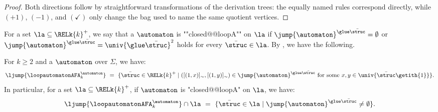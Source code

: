 \documentclass[10pt,a4paper]{article}
\theoremstyle{definition}
\theoremstyle{remark}
\DeclarePairedDelimiter\set{\{}{\}}
\DeclarePairedDelimiter\tuple{(}{)}
\newcommand{\mul}[1]{\bar{#1}}
\newcommand{\vsig}{\Sigma}
\begin{document}
\begin{proof}
Both directions follow by straightforward transformations of the derivation trees:
the equally named rules correspond directly, while $(+1)$, $(-1)$, and $(\checkmark)$
only change the bag used to name the same quotient vertices.
\end{proof}
For a set $\la \subseteq \RELk{k}^{+}$,
we say that a  $\automaton$ is ""closed@@loopA"" on $\la$ if $\jump{\automaton}^{\glue \mul{\struc}} = \emptyset$ or $\jump{\automaton}^{\glue \mul{\struc}} = \univ{\glue \mul{\struc}}^2$ holds for every $\mul{\struc} \in \la$.
By , we have the following.
\begin{lem}\label{lemma: to 2AFA}
    For $k \ge 2$ and a  $\automaton$ over $\vsig$,
    we have:
    \[\ljump{\loopautomatonAFA_{k}^{\automaton}} ~=~ \set{\mul{\struc} \in \RELk{k}^{+} \mid \tuple{[\tuple{1,x}]_{\sim}, [\tuple{1,y}]_{\sim}} \in \jump{\automaton}^{\glue \mul{\struc}} \mbox{ for some $x, y \in \univ{\mul{\struc}\getith{1}}$}}.\]
    In particular, for a set $\la \subseteq \RELk{k}^{+}$, if $\automaton$ is "closed@@loopA" on $\la$,
    we have:
    \[\ljump{\loopautomatonAFA_{k}^{\automaton}} \cap \la ~=~ \set{\mul{\struc} \in \la \mid \jump{\automaton}^{\glue \mul{\struc}} \neq \emptyset}.\]
\end{lem}
\end{document}
